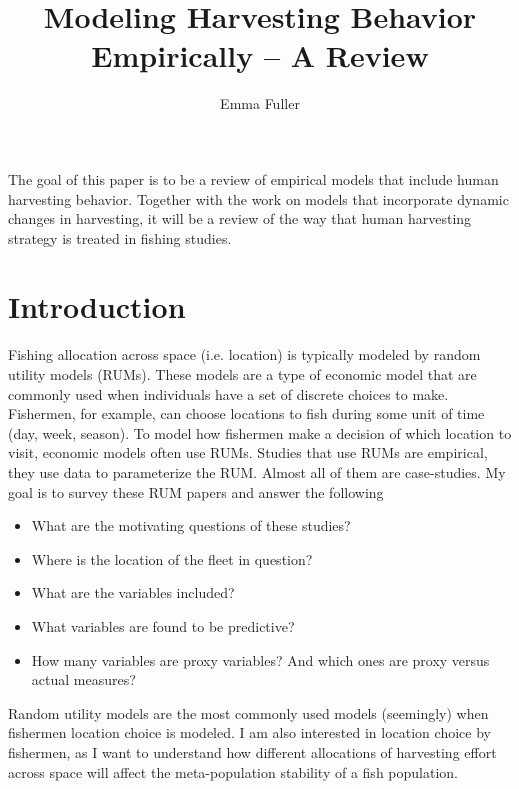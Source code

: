\documentclass[12pt, a4paper]{article}
\title{Modeling Harvesting Behavior Empirically -- A Review}
\author{Emma Fuller}
\date{} 	%
\begin{document}
\maketitle
\noindent The goal of this paper is to be a review of empirical models that include human harvesting behavior. Together with the work on models that incorporate dynamic changes in harvesting, it will be a review of the way that human harvesting strategy is treated in fishing studies.

\tableofcontents


\section{Introduction}
Fishing allocation across space (i.e. location) is typically modeled by random utility models (RUMs). These models are a type of economic model that are commonly used when individuals have a set of discrete choices to make. Fishermen, for example, can choose locations to fish during some unit of time (day, week, season). To model how fishermen make a decision of which location to visit, economic models often use RUMs. Studies that use RUMs are empirical, they use data to parameterize the RUM. Almost all of them are case-studies. My goal is to survey these RUM papers and answer the following

\begin{itemize}
\item What are the motivating questions of these studies?
\item Where is the location of the fleet in question?
\item What are the variables included? 
\item What variables are found to be predictive?
\item How many variables are proxy variables? And which ones are proxy versus actual measures?
\end{itemize}

\noindent Random utility models are the most commonly used models (seemingly) when fishermen location choice is modeled. I am also interested in location choice by fishermen, as I want to understand how different allocations of harvesting effort across space will affect the meta-population stability of a fish population. 
\end{document}
